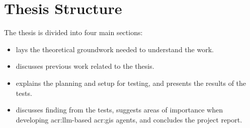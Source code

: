 \section{Thesis Structure}
\label{sec:thesisStructure}

The thesis is divided into four main sections:
\begin{itemize}
    \item {} lays the theoretical groundwork needed to understand the work.
    \item {} discusses previous work related to the thesis.
    \item {} explains the planning and setup for testing, and presents the results of the tests.
    \item {} discusses finding from the tests, suggests areas of importance when developing \acrshort{acr:llm}-based \acrshort{acr:gis} agents, and concludes the project report.
\end{itemize}

\glsresetall